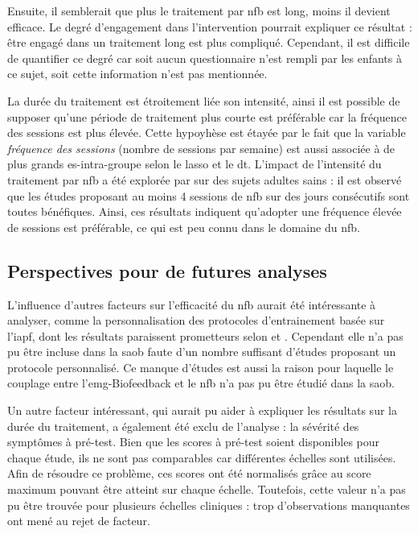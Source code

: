 Ensuite, il semblerait que plus le traitement par \gls{nfb} est long, moins il devient efficace. Le degré d'engagement dans l'intervention pourrait expliquer ce
résultat : être engagé dans un traitement long est plus compliqué. Cependant, il est difficile de quantifier ce degré car soit aucun questionnaire n'est rempli 
par les enfants à ce sujet, soit cette information n'est pas mentionnée. 

La durée du traitement est étroitement liée son intensité, ainsi il est possible de supposer qu'une période de traitement plus courte est préférable 
car la fréquence des sessions est plus élevée. Cette hypoyhèse est étayée par 
le fait que la variable \textit{fréquence des sessions} (nombre de sessions par semaine) est aussi associée à de plus grands \gls{es}-intra-groupe selon le
\gls{lasso} et le \gls{dt}. L'impact de l'intensité du traitement par \gls{nfb} a été explorée par \citet{Rogala2016} sur des sujets adultes sains : il est
observé que les études proposant au moins 4 sessions de \gls{nfb} sur des jours consécutifs sont toutes bénéfiques. Ainsi, ces résultats indiquent qu'adopter une fréquence 
élevée de sessions est préférable, ce qui est peu connu dans le domaine du \gls{nfb}.

\subsection{Perspectives pour de futures analyses}

L'influence d'autres facteurs sur l'efficacité du \gls{nfb} aurait été intéressante à analyser, comme la personnalisation des protocoles d'entrainement basée sur l'\gls{iapf},
dont les résultats paraissent prometteurs selon \citet{Bazanova2018} et \citet{Escolano2014}. Cependant elle n'a pas pu être incluse dans la \gls{saob} faute d'un 
nombre suffisant d'études proposant un protocole personnalisé. Ce manque d'études est aussi la raison pour laquelle le couplage entre l'\gls{emg}-Biofeedback et le 
\gls{nfb} n'a pas pu être étudié dans la \gls{saob}. 

Un autre facteur intéressant, qui aurait pu aider à expliquer les résultats sur la durée du traitement, a 
également été exclu de l'analyse : la sévérité des symptômes à pré-test. Bien que les scores à pré-test soient disponibles pour chaque étude, ils ne sont pas
comparables car différentes échelles sont utilisées. Afin de résoudre ce problème, ces scores ont été normalisés grâce au score maximum pouvant être atteint
sur chaque échelle. Toutefois, cette valeur n'a pas pu être trouvée pour plusieurs échelles cliniques : trop d'observations manquantes ont mené au rejet de facteur.

